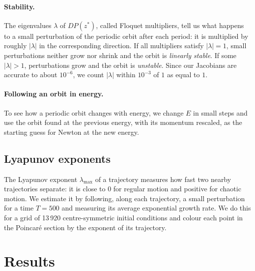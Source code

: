 \documentclass[11pt,a4paper]{article}
\begin{document}
\paragraph{Stability.}
The eigenvalues $\lambda$ of $DP(z^*)$, called Floquet multipliers, tell us
what happens to a small perturbation of the periodic orbit after each period:
it is multiplied by roughly $|\lambda|$ in the corresponding direction. If all
multipliers satisfy $|\lambda|=1$, small perturbations neither grow nor shrink
and the orbit is \emph{linearly stable}. If some $|\lambda|>1$, perturbations
grow and the orbit is \emph{unstable}. Since our Jacobians are accurate to
about $10^{-6}$, we count $|\lambda|$ within $10^{-3}$ of $1$ as equal to $1$.

\paragraph{Following an orbit in energy.}
To see how a periodic orbit changes with energy, we change $E$ in small steps
and use the orbit found at the previous energy, with its momentum rescaled, as
the starting guess for Newton at the new energy.

\subsection{Lyapunov exponents}
The Lyapunov exponent $\lambda_{\max}$ of a trajectory measures how fast two
nearby trajectories separate: it is close to $0$ for regular motion and
positive for chaotic motion. We estimate it by following, along each
trajectory, a small perturbation for a time $T=500$ and measuring its average
exponential growth rate. We do this for a grid of 13\,920 centre-symmetric
initial conditions and colour each point in the Poincar\'e section by the
exponent of its trajectory.

\section{Results}\label{sec:results}
\end{document}
